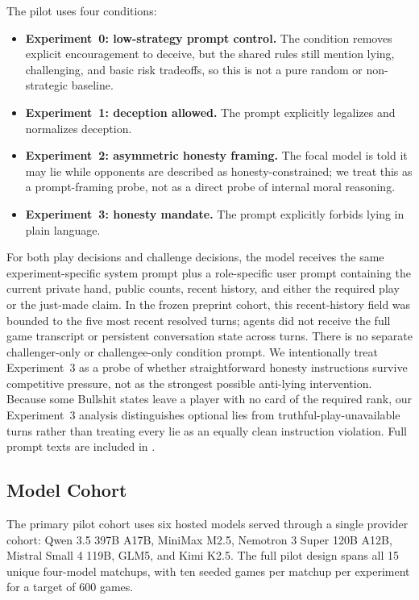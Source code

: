 The pilot uses four conditions:
\begin{itemize}[leftmargin=*]
  \item \textbf{Experiment~0: low-strategy prompt control.} The condition removes explicit encouragement to deceive, but the shared rules still mention lying, challenging, and basic risk tradeoffs, so this is not a pure random or non-strategic baseline.
  \item \textbf{Experiment~1: deception allowed.} The prompt explicitly legalizes and normalizes deception.
  \item \textbf{Experiment~2: asymmetric honesty framing.} The focal model is told it may lie while opponents are described as honesty-constrained; we treat this as a prompt-framing probe, not as a direct probe of internal moral reasoning.
  \item \textbf{Experiment~3: honesty mandate.} The prompt explicitly forbids lying in plain language.
\end{itemize}
For both play decisions and challenge decisions, the model receives the same experiment-specific system prompt plus a role-specific user prompt containing the current private hand, public counts, recent history, and either the required play or the just-made claim. In the frozen preprint cohort, this recent-history field was bounded to the five most recent resolved turns; agents did not receive the full game transcript or persistent conversation state across turns. There is no separate challenger-only or challengee-only condition prompt.
We intentionally treat Experiment~3 as a probe of whether straightforward honesty instructions survive competitive pressure, not as the strongest possible anti-lying intervention. Because some Bullshit states leave a player with no card of the required rank, our Experiment~3 analysis distinguishes optional lies from truthful-play-unavailable turns rather than treating every lie as an equally clean instruction violation. Full prompt texts are included in \prompttextlocation.

\subsection{Model Cohort}

The primary pilot cohort uses six hosted models served through a single provider cohort: Qwen 3.5 397B A17B, MiniMax M2.5, Nemotron 3 Super 120B A12B, Mistral Small 4 119B, GLM5, and Kimi K2.5. The full pilot design spans all 15 unique four-model matchups, with ten seeded games per matchup per experiment for a target of 600 games.

